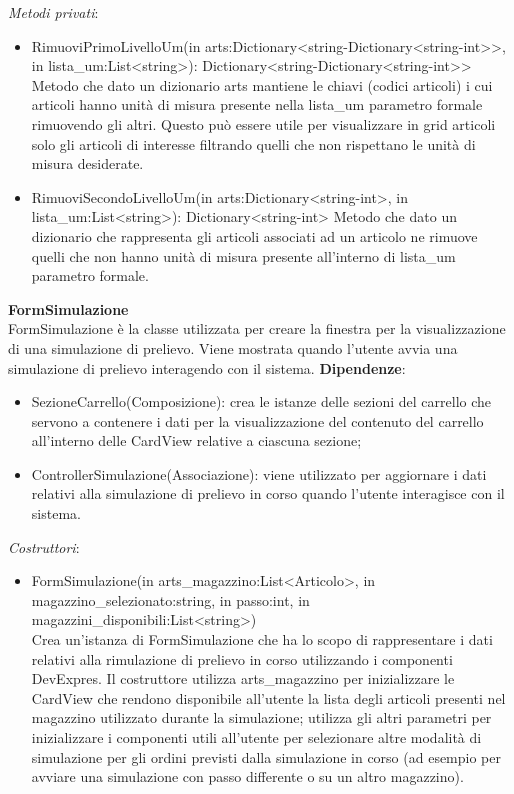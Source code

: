 \textit{Metodi privati}:\\
\begin{itemize}
    \item RimuoviPrimoLivelloUm(in arts:Dictionary<string-Dictionary<string-int>>, in lista\_um:List<string>): Dictionary<string-Dictionary<string-int>>
    Metodo che dato un dizionario arts mantiene le chiavi (codici articoli) i cui articoli hanno unità di misura presente nella lista\_um parametro formale rimuovendo gli altri.
    Questo può essere utile per visualizzare in grid articoli solo gli articoli di interesse filtrando quelli che non rispettano le unità di misura desiderate. 
    \item RimuoviSecondoLivelloUm(in arts:Dictionary<string-int>, in lista\_um:List<string>): Dictionary<string-int>
    Metodo che dato un dizionario che rappresenta gli articoli associati ad un articolo ne rimuove quelli che non hanno unità di misura presente all'interno di lista\_um
    parametro formale.
\end{itemize}  
\textbf{FormSimulazione}\\
FormSimulazione è la classe utilizzata per creare la finestra per la visualizzazione di una simulazione di prelievo.
Viene mostrata quando l'utente avvia una simulazione di prelievo interagendo con il sistema.
\textbf{Dipendenze}:
\begin{itemize}
    \item SezioneCarrello(Composizione): crea le istanze delle sezioni del carrello che servono a contenere i dati per la visualizzazione del contenuto del carrello all'interno delle CardView relative a
    ciascuna sezione;\\
    \item ControllerSimulazione(Associazione): viene utilizzato per aggiornare i dati relativi alla simulazione di prelievo in corso quando l'utente interagisce con il sistema.
\end{itemize}
\textit{Costruttori}:\\
\begin{itemize}
    \item FormSimulazione(in arts\_magazzino:List<Articolo>, in magazzino\_selezionato:string, in passo:int, in magazzini\_disponibili:List<string>)\\
    Crea un'istanza di FormSimulazione che ha lo scopo di rappresentare i dati relativi alla rimulazione di prelievo in corso utilizzando i componenti DevExpres.
    Il costruttore utilizza arts\_magazzino per inizializzare le CardView che rendono disponibile all'utente la lista degli articoli presenti nel magazzino utilizzato durante la simulazione;
    utilizza gli altri parametri per inizializzare i componenti utili all'utente per selezionare altre modalità di simulazione per gli ordini previsti dalla simulazione in corso (ad esempio per avviare 
    una simulazione con passo differente o su un altro magazzino).
\end{itemize}

